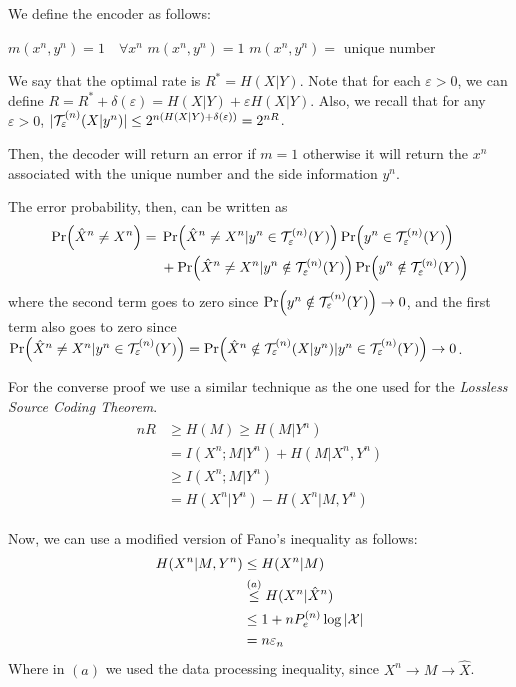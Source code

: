 
We define the encoder as follows:
%
\begin{algorithm}
	{$ m(x^n,y^n) = 1 \quad \forall x^n$}
	{
		{$ m(x^n,y^n) = 1$}
		{$m(x^n,y^n) = $ unique number}
	}
\end{algorithm}

We say that the optimal rate is $R^*=H(X|Y)$. Note that for each $\varepsilon>0$, we can define $R = R^* + \delta(\varepsilon) = H(X|Y) + \varepsilon H(X|Y)$. Also, we recall that for any $\varepsilon>0$, $|\mathcal{T}_\varepsilon^{(n)}(X|y^n)| \leq 2^{n(H(X|Y) + \delta(\varepsilon))} = 2^{nR}$.

Then, the decoder will return an error if $m=1$ otherwise it will return the $x^n$ associated with the unique number and the side information $y^n$.

The error probability, then, can be written as
%
\begin{align}
\begin{split}
\Pr(\hat{X}^n \neq X^n) ={}& \Pr(\hat{X}^n \neq X^n|y^n\in \mathcal{T}_\varepsilon^{(n)}(Y))\Pr(y^n\in \mathcal{T}_\varepsilon^{(n)}(Y))\\
&+ \Pr(\hat{X}^n \neq X^n|y^n\notin \mathcal{T}_\varepsilon^{(n)}(Y))\Pr(y^n\notin \mathcal{T}_\varepsilon^{(n)}(Y))
\end{split}
\end{align}
%
where the second term goes to zero since $\Pr(y^n\notin \mathcal{T}_\varepsilon^{(n)}(Y)) \rightarrow 0$, and the first term also goes to zero since $\Pr(\hat{X}^n \neq X^n|y^n\in \mathcal{T}_\varepsilon^{(n)}(Y)) = \Pr(\hat{X}^n \notin \mathcal{T}_\varepsilon^{(n)}(X|y^n) |y^n\in \mathcal{T}_\varepsilon^{(n)}(Y)) \rightarrow 0$.

For the converse proof we use a similar technique as the one used for the \textit{Lossless Source Coding Theorem}.
%
\begin{align}
\begin{split}
nR &\geq H(M) \geq H(M|Y^n)\\
&= I(X^n;M|Y^n) + H(M|X^n,Y^n)\\
&\geq I(X^n;M|Y^n)\\
&= H(X^n|Y^n) - H(X^n|M,Y^n)
\end{split}
\end{align}

Now, we can use a modified version of Fano's inequality as follows:
%
\begin{align}
\begin{split}
H(X^n|M,Y^n) &\leq H(X^n|M)\\
&\stackrel{(a)}{\leq} H(X^n|\hat{X}^n)\\
&\leq 1 + n P_e^{(n)}  \log |\mathcal{X}|\\
&= n \varepsilon_n
\end{split}
\end{align}
Where in $(a)$ we used the data processing inequality, since $X^n \rightarrow M \rightarrow \hat{X}$.

